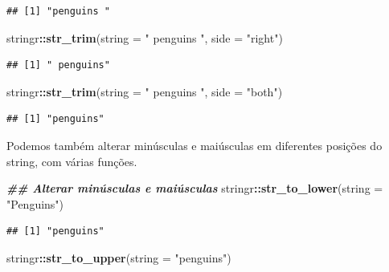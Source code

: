 \documentclass[
]{article}
\newenvironment{Shaded}{\begin{snugshade}}{\end{snugshade}}
\newcommand{\AttributeTok}[1]{\textcolor[rgb]{0.13,0.29,0.53}{#1}}
\newcommand{\DocumentationTok}[1]{\textcolor[rgb]{0.56,0.35,0.01}{\textbf{\textit{#1}}}}
\newcommand{\FunctionTok}[1]{\textcolor[rgb]{0.13,0.29,0.53}{\textbf{#1}}}
\newcommand{\NormalTok}[1]{#1}
\newcommand{\SpecialCharTok}[1]{\textcolor[rgb]{0.81,0.36,0.00}{\textbf{#1}}}
\newcommand{\StringTok}[1]{\textcolor[rgb]{0.31,0.60,0.02}{#1}}
\begin{document}
\begin{verbatim}
## [1] "penguins "
\end{verbatim}

\begin{Shaded}
\begin{Highlighting}[]
\NormalTok{stringr}\SpecialCharTok{::}\FunctionTok{str\_trim}\NormalTok{(}\AttributeTok{string =} \StringTok{" penguins "}\NormalTok{, }\AttributeTok{side =} \StringTok{"right"}\NormalTok{)}
\end{Highlighting}
\end{Shaded}

\begin{verbatim}
## [1] " penguins"
\end{verbatim}

\begin{Shaded}
\begin{Highlighting}[]
\NormalTok{stringr}\SpecialCharTok{::}\FunctionTok{str\_trim}\NormalTok{(}\AttributeTok{string =} \StringTok{" penguins "}\NormalTok{, }\AttributeTok{side =} \StringTok{"both"}\NormalTok{)}
\end{Highlighting}
\end{Shaded}

\begin{verbatim}
## [1] "penguins"
\end{verbatim}

Podemos também alterar minúsculas e maiúsculas em diferentes posições do string, com várias funções.

\begin{Shaded}
\begin{Highlighting}[]
\DocumentationTok{\#\# Alterar minúsculas e maiúsculas}
\NormalTok{stringr}\SpecialCharTok{::}\FunctionTok{str\_to\_lower}\NormalTok{(}\AttributeTok{string =} \StringTok{"Penguins"}\NormalTok{)}
\end{Highlighting}
\end{Shaded}

\begin{verbatim}
## [1] "penguins"
\end{verbatim}

\begin{Shaded}
\begin{Highlighting}[]
\NormalTok{stringr}\SpecialCharTok{::}\FunctionTok{str\_to\_upper}\NormalTok{(}\AttributeTok{string =} \StringTok{"penguins"}\NormalTok{)}
\end{Highlighting}
\end{Shaded}
\end{document}
